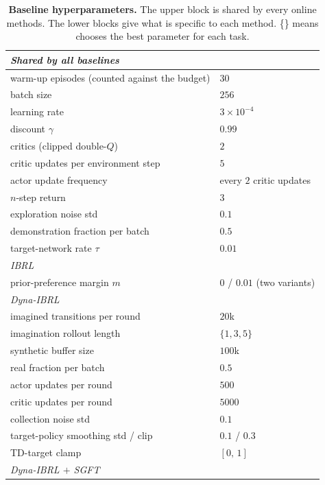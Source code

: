 \documentclass{article} %
\begin{document}
\begin{table}[h]
\centering
\caption{\textbf{Baseline hyperparameters.} The upper block is shared by every online methods. The lower blocks give what is specific to each method. \{\} means chooses the best parameter for each task.}
\label{tab:app-baselines}
\small
\begin{tabular}{ll}
\toprule
\multicolumn{2}{l}{\emph{Shared by all baselines}} \\
\midrule
warm-up episodes (counted against the budget) & $30$ \\
batch size                        & $256$ \\
learning rate                     & $3{\times}10^{-4}$ \\
discount $\gamma$                 & $0.99$ \\
critics (clipped double-$Q$)      & $2$ \\
critic updates per environment step & $5$ \\
actor update frequency            & every $2$ critic updates \\
$n$-step return                   & $3$ \\
exploration noise std             & $0.1$ \\
demonstration fraction per batch  & $0.5$ \\
target-network rate $\tau$        & $0.01$ \\
\midrule
\multicolumn{2}{l}{\emph{IBRL}} \\
\midrule
prior-preference margin $m$       & $0$ / $0.01$ (two variants) \\
\midrule
\multicolumn{2}{l}{\emph{Dyna-IBRL}} \\
\midrule
imagined transitions per round    & $20$k \\
imagination rollout length        & $\{1,3,5\}$ \\
synthetic buffer size             & $100$k \\
real fraction per batch           & $0.5$ \\
actor updates per round           & $500$ \\
critic updates per round          & $5000$ \\
collection noise std              & $0.1$ \\
target-policy smoothing std / clip & $0.1$ / $0.3$ \\
TD-target clamp                   & $[0,\,1]$ \\
\midrule
\multicolumn{2}{l}{\textit{Dyna-IBRL $+$ SGFT}} \\

\end{tabular}
\end{table}
\end{document}
